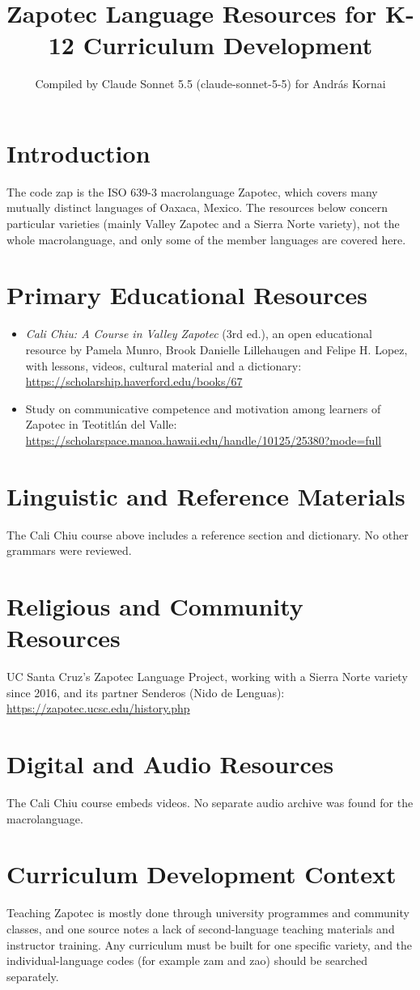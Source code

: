 \documentclass[12pt]{article}
\title{Zapotec Language Resources for K-12 Curriculum Development}
\author{Compiled by Claude Sonnet 5.5 (claude-sonnet-5-5) for Andr\'as Kornai}
\date{}
\begin{document}
\maketitle

\section{Introduction}
The code zap is the ISO 639-3 macrolanguage Zapotec, which covers many mutually distinct languages of Oaxaca, Mexico. The resources below concern particular varieties (mainly Valley Zapotec and a Sierra Norte variety), not the whole macrolanguage, and only some of the member languages are covered here.

\section{Primary Educational Resources}
\begin{itemize}
\item \emph{Cali Chiu: A Course in Valley Zapotec} (3rd ed.), an open educational resource by Pamela Munro, Brook Danielle Lillehaugen and Felipe H. Lopez, with lessons, videos, cultural material and a dictionary: \url{https://scholarship.haverford.edu/books/67}
\item Study on communicative competence and motivation among learners of Zapotec in Teotitl\'an del Valle: \url{https://scholarspace.manoa.hawaii.edu/handle/10125/25380?mode=full}
\end{itemize}

\section{Linguistic and Reference Materials}
The Cali Chiu course above includes a reference section and dictionary. No other grammars were reviewed.

\section{Religious and Community Resources}
UC Santa Cruz's Zapotec Language Project, working with a Sierra Norte variety since 2016, and its partner Senderos (Nido de Lenguas): \url{https://zapotec.ucsc.edu/history.php}

\section{Digital and Audio Resources}
The Cali Chiu course embeds videos. No separate audio archive was found for the macrolanguage.

\section{Curriculum Development Context}
Teaching Zapotec is mostly done through university programmes and community classes, and one source notes a lack of second-language teaching materials and instructor training. Any curriculum must be built for one specific variety, and the individual-language codes (for example zam and zao) should be searched separately.
\end{document}

